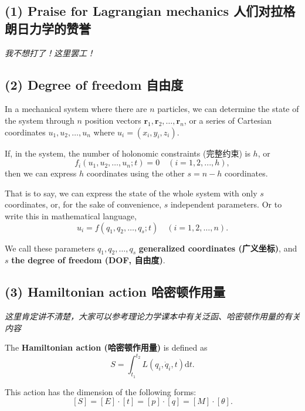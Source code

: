 \subsection*{(1) Praise for Lagrangian mechanics
人们对拉格朗日力学的赞誉}\label{praise-for-lagrangian-mechanics-ux4ebaux4eecux5bf9ux62c9ux683cux6717ux65e5ux529bux5b66ux7684ux8d5eux8a89}

\emph{我不想打了！这里罢工！}

\subsection*{(2) Degree of freedom
自由度}\label{degree-of-freedom-ux81eaux7531ux5ea6}

In a mechanical system where there are \(n\) particles, we can determine
the state of the system through \(n\) position vectors
\(\boldsymbol{r}_1, \boldsymbol{r}_2, \dots, \boldsymbol{r}_n\), or a
series of Cartesian coordinates \(u_1, u_2, \dots, u_n\) where
\(u_i = (x_i, y_i, z_i)\).

If, in the system, the number of holonomic constraints (完整约束) is
\(h\), or \[f_i(u_1, u_2, \dots, u_n; t) = 0 \quad(i = 1, 2, ..., h),\]
then we can express \(h\) coordinates using the other \(s = n - h\)
coordinates.

That is to say, we can express the state of the whole system with only
\(s\) coordinates, or, for the sake of convenience, \(s\) independent
parameters. Or to write this in mathematical language,
\[u_i = f(q_1, q_2, \dots, q_s; t) \quad (i = 1, 2, \dots, n).\]

We call these parameters \(q_1, q_2, \dots, q_s\) \textbf{generalized
coordinates (广义坐标)}, and \(s\) \textbf{the degree of freedom (DOF,
自由度)}.

\subsection*{(3) Hamiltonian action
哈密顿作用量}\label{hamiltonian-action-ux54c8ux5bc6ux987fux4f5cux7528ux91cf}

\emph{这里肯定讲不清楚，大家可以参考理论力学课本中有关泛函、哈密顿作用量的有关内容}

The \textbf{Hamiltonian action (哈密顿作用量)} is defined as
\[S = \int_{t_1}^{t_2} L(q_i, \dot{q}_i, t) \mathrm{d}t.\]

This action has the dimension of the following forms:
\[\left[S\right] = \left[E\right] \cdot \left[t\right] = \left[p\right] \cdot \left[q\right] = \left[M\right] \cdot \left[ \theta \right].\]

